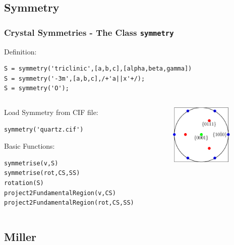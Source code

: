\subsection*{Symmetry}
\begin{frame}[fragile]
  \frametitle{Crystal Symmetries - The \MTEX Class \texttt{\bf symmetry}}

  Definition:

\begin{lstlisting}
S = symmetry('triclinic',[a,b,c],[alpha,beta,gamma])
S = symmetry('-3m',[a,b,c],/+'a||x'+/);
S = symmetry('O');
\end{lstlisting}

\medskip

\begin{columns}
  \begin{column}{8.5cm}

Load Symmetry from CIF file:

\begin{lstlisting}
symmetry('quartz.cif')
\end{lstlisting}

\medskip

    Basic Functions:

\begin{lstlisting}
symmetrise(v,S)
symmetrise(rot,CS,SS)
rotation(S)
project2FundamentalRegion(v,CS)
project2FundamentalRegion(rot,CS,SS)
\end{lstlisting}
  \end{column}

  \begin{column}{3cm}
    \includegraphics[width=3cm]{pic/sym}
  \end{column}

\end{columns}

\end{frame}

\subsection*{Miller}

